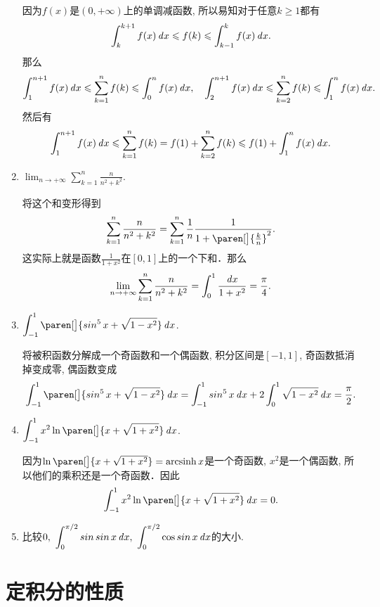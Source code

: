 \begin{enumerate}
  \ifshowsol
    因为\(f(x)\)是\((0,+\infty)\)上的单调减函数, 所以易知对于任意\(k \ge 1\)都有
    \[
      \int_k^{k+1} f(x) \dx \le f(k) \le \int_{k-1}^k f(x) \dx.
    \]
    那么
    \[
      \int_1^{n+1} f(x) \dx \le \sum_{k=1}^n f(k) \le \int_0^n f(x) \dx, \quad
      \int_2^{n+1} f(x) \dx \le \sum_{k=2}^n f(k) \le \int_1^n f(x) \dx.
    \]
    然后有
    \[
      \int_1^{n+1} f(x) \dx \le \sum_{k=1}^n f(k) = f(1) + \sum_{k=2}^n f(k) \le f(1) + \int_1^n f(x) \dx.
    \]
  \fi

\item \(\displaystyle \lim_{n\to+\infty} \sum_{k=1}^n \frac{n}{n^2+k^2} \).

  \ifshowsol
    将这个和变形得到
    \[
      \sum_{k=1}^n \frac{n}{n^2+k^2}
      = \sum_{k=1}^n \frac1n \frac{1}{1+\paren[\big]{\frac{k}{n}}^2}.
    \]
    这实际上就是函数\(\frac{1}{1+x^2}\)在\([0,1]\)上的一个下和．那么
    \[
      \lim_{n\to+\infty} \sum_{k=1}^n \frac{n}{n^2+k^2} = \int_0^1 \frac{\mathop{}\!\mathit{d} x}{1+x^2} = \frac{\pi}{4}.
    \]
  \fi

\item \(\displaystyle \int_{-1}^1 \paren[\big]{\sin^5 x + \sqrt{1 - x^2}} \dx\).

  \ifshowsol
    将被积函数分解成一个奇函数和一个偶函数, 积分区间是\([-1,1]\), 奇函数抵消掉变成零, 偶函数变成
    \[
      \int_{-1}^1 \paren[\big]{\sin^5 x + \sqrt{1 - x^2}} \dx
      = \int_{-1}^1 \sin^5 x \dx + 2 \int_0^1 \sqrt{1-x^2} \dx
      = \frac{\pi}{2}.
    \]
  \fi

\item \(\displaystyle \int_{-1}^1 x^2 \ln\paren[\big]{x + \sqrt{1 + x^2}} \dx\).

  \ifshowsol
    因为\(\ln\paren[\big]{x + \sqrt{1 + x^2}} = \arcsinh x\)是一个奇函数, \(x^2\)是一个偶函数, 所以他们的乘积还是一个奇函数．因此
    \[
      \int_{-1}^1 x^2 \ln\paren[\big]{x + \sqrt{1 + x^2}} \dx = 0.
    \]
  \fi

\item 比较\(\displaystyle 0,\ \int_0^{\pi/2} \operatorname{\smash{sin}}\operatorname{\smash{sin}} x \mathop{}\!\mathit{d} x,\ \int_0^{\pi/2} \cos\operatorname{\smash{sin}} x \mathop{}\!\mathit{d} x\)的大小.
\end{enumerate}
\fi

\section{定积分的性质}

